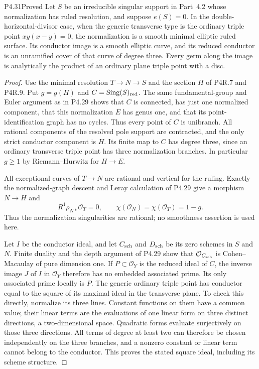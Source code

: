 \begin{statement}{P4.31}{Proved}
Let $S$ be an irreducible singular support in Part~4.2 whose
normalization has ruled resolution, and suppose $e(S)=0$.
In the double-horizontal-divisor case, when the generic
transverse type is the ordinary triple point $xy(x-y)=0$,
the normalization is a smooth minimal elliptic ruled surface.
Its conductor image is a smooth elliptic curve, and its
reduced conductor is an unramified cover of that curve of
degree three. Every germ along the image is analytically
the product of an ordinary plane triple point with a disc.
\end{statement}
\begin{proof}
Use the minimal resolution $T\to N\to S$ and the section $H$
of P4R.7 and P4R.9. Put $g=g(H)$ and
$C=\operatorname{Sing}(S)_{\rm red}$.
The same fundamental-group and Euler argument as in P4.29
shows that $C$ is connected, has just one normalized
component, that this normalization $E$ has genus one, and
that its point-identification graph has no cycles. Thus
every point of $C$ is unibranch. All rational components
of the resolved pole support are contracted, and the
only strict conductor component is $H$. Its finite map
to $C$ has degree three, since an ordinary transverse
triple point has three normalization branches.
In particular $g\ge1$ by Riemann--Hurwitz for $H\to E$.

All exceptional curves of $T\to N$ are rational and
vertical for the ruling. Exactly the normalized-graph
descent and Leray calculation of P4.29 give a morphism
$N\to H$ and
\[
 R^1\rho_{N*}\mathcal O_T=0,\qquad
 \chi(\mathcal O_N)=\chi(\mathcal O_T)=1-g.
\]
Thus the normalization singularities are rational; no
smoothness assertion is used here.

Let $I$ be the conductor ideal, and let $C_{\rm sch}$
and $D_{\rm sch}$ be its zero schemes in $S$ and $N$.
Finite duality and the depth argument of P4.29 show that
$\mathcal O_{C_{\rm sch}}$ is Cohen--Macaulay of pure
dimension one. If $P\subset\mathcal O_Y$ is the reduced
ideal of $C$, the inverse image $J$ of $I$ in
$\mathcal O_Y$ therefore has no embedded associated
prime. Its only associated prime locally is $P$.
The generic ordinary triple point has conductor equal
to the square of its maximal ideal in the transverse
plane. To check this directly, normalize its three
lines. Constant functions on them have a common value;
their linear terms are the evaluations of one linear
form on three distinct directions, a two-dimensional
space. Quadratic forms evaluate surjectively on those
three directions. All terms of degree at least two
can therefore be chosen independently on the three
branches, and a nonzero constant or linear term cannot
belong to the conductor. This proves the stated square
ideal, including its scheme structure.


\end{proof}

